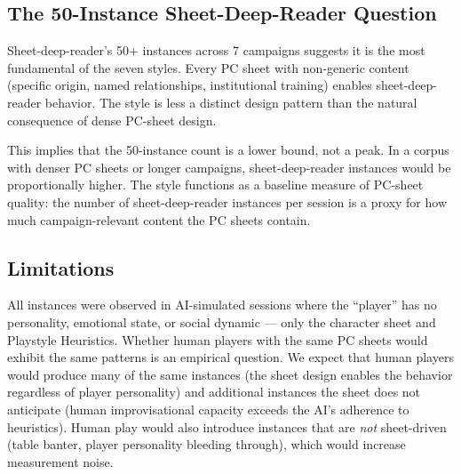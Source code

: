 \subsection{The 50-Instance Sheet-Deep-Reader Question}

Sheet-deep-reader's 50+ instances across 7 campaigns suggests it is the most
fundamental of the seven styles. Every PC sheet with non-generic content (specific
origin, named relationships, institutional training) enables sheet-deep-reader behavior.
The style is less a distinct design pattern than the natural consequence of dense
PC-sheet design.

This implies that the 50-instance count is a lower bound, not a peak. In a corpus with
denser PC sheets or longer campaigns, sheet-deep-reader instances would be proportionally
higher. The style functions as a baseline measure of PC-sheet quality: the number of
sheet-deep-reader instances per session is a proxy for how much campaign-relevant
content the PC sheets contain.

\subsection{Limitations}

All instances were observed in AI-simulated sessions where the ``player'' has no
personality, emotional state, or social dynamic --- only the character sheet and
Playstyle Heuristics. Whether human players with the same PC sheets would exhibit
the same patterns is an empirical question. We expect that human players would produce
many of the same instances (the sheet design enables the behavior regardless of player
personality) and additional instances the sheet does not anticipate (human improvisational
capacity exceeds the AI's adherence to heuristics). Human play would also introduce
instances that are \textit{not} sheet-driven (table banter, player personality
bleeding through), which would increase measurement noise.
